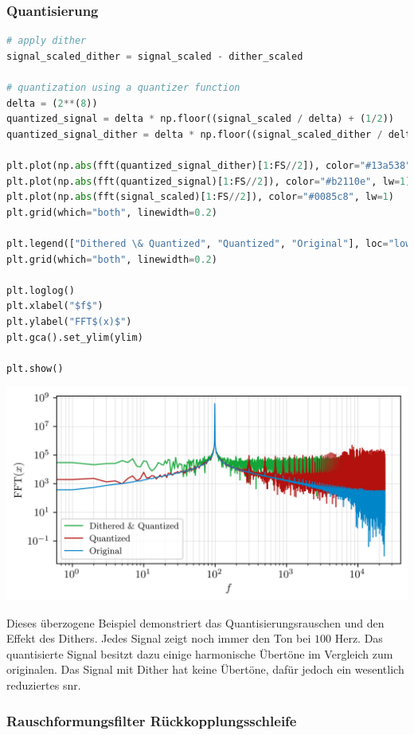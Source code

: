 \hypertarget{quantisierung}{%
\subsubsection{Quantisierung}\label{quantisierung}}

\begin{lstlisting}[language=Python]
# apply dither
signal_scaled_dither = signal_scaled - dither_scaled

# quantization using a quantizer function
delta = (2**(8))
quantized_signal = delta * np.floor((signal_scaled / delta) + (1/2))
quantized_signal_dither = delta * np.floor((signal_scaled_dither / delta) + (1/2))

plt.plot(np.abs(fft(quantized_signal_dither)[1:FS//2]), color="#13a538", lw=1)
plt.plot(np.abs(fft(quantized_signal)[1:FS//2]), color="#b2110e", lw=1)
plt.plot(np.abs(fft(signal_scaled)[1:FS//2]), color="#0085c8", lw=1)
plt.grid(which="both", linewidth=0.2)

plt.legend(["Dithered \& Quantized", "Quantized", "Original"], loc="lower left", fontsize="small")
plt.grid(which="both", linewidth=0.2)

plt.loglog()
plt.xlabel("$f$")
plt.ylabel("FFT$(x)$")
plt.gca().set_ylim(ylim)

plt.show()
\end{lstlisting}

\includegraphics{./img/069db9acad0a7fc28eabd04fd9e5d0eebe5249bf.png}

Dieses überzogene Beispiel demonstriert das Quantisierungsrauschen und
den Effekt des Dithers. Jedes Signal zeigt noch immer den Ton bei
\(100\) Herz. Das quantisierte Signal besitzt dazu einige harmonische
Übertöne im Vergleich zum originalen. Das Signal mit Dither hat keine
Übertöne, dafür jedoch ein wesentlich reduziertes \gls{snr}.

\hypertarget{rauschformungsfilter-ruxfcckkopplungsschleife}{%
\subsubsection{Rauschformungsfilter
Rückkopplungsschleife}\label{rauschformungsfilter-ruxfcckkopplungsschleife}}


